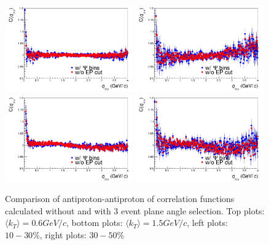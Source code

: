 \begin{figure}%
  \centering
  \includegraphics[width=0.49\textwidth]{cfAPAPsemicentral_ptdcattcpsipidkT0c2}
  \includegraphics[width=0.49\textwidth]{cfAPAPsemicentral_ptdcattcpsipidkT0c4}
  \includegraphics[width=0.49\textwidth]{cfAPAPsemicentral_ptdcattcpsipidkT1c2}
  \includegraphics[width=0.49\textwidth]{cfAPAPsemicentral_ptdcattcpsipidkT1c4}
  \caption{Comparison of antiproton-antiproton of correlation functions calculated without and with 3 event plane angle selection. Top plots: $\langle k_T \rangle = 0.6 GeV/c$, bottom plots: $\langle k_T \rangle = 1.5 GeV/c$, left plots: $10-30 \%$, right plots: $30-50 \%$}
  \label{apappsi3}
\end{figure}


